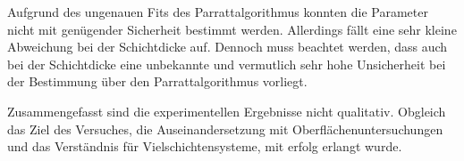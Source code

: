 Aufgrund des ungenauen Fits des Parrattalgorithmus konnten die Parameter nicht mit genügender Sicherheit bestimmt werden. Allerdings fällt eine sehr kleine Abweichung 
bei der Schichtdicke auf. Dennoch muss beachtet werden, dass auch bei der Schichtdicke eine unbekannte und vermutlich sehr hohe Unsicherheit bei der Bestimmung über 
den Parrattalgorithmus vorliegt. 

Zusammengefasst sind die experimentellen Ergebnisse nicht qualitativ. Obgleich das Ziel des Versuches, die Auseinandersetzung mit Oberflächenuntersuchungen und das Verständnis 
für Vielschichtensysteme, mit erfolg erlangt wurde. 